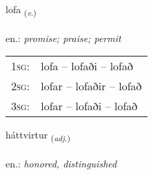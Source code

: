 \documentclass[frontgrid, backgrid]{flacards}\usepackage[]{graphicx}\usepackage[]{xcolor}
\begin{document}
\renewcommand{\flhead}{\vskip5pt \fboxsep=0pt {\small\bfseries\footnotesize Sagnorð | Verb}}
\renewcommand{\fcfoot}{\vskip5pt \fboxsep=0pt \hspace{2pt}{\small\bfseries\footnotesize 2K}}

\renewcommand{\blhead}{\vskip5pt {\small\bfseries\footnotesize Sagnorð | Verb }}
\renewcommand{\bcfoot}{\vskip5pt \hspace{2pt}{\small\bfseries\footnotesize 2K}}


{lofa \small{\textsubscript{(\textit{v.})}} \\[1ex] %
\textphonetic{[lɔːva]} \\
en.: \emph{promise; praise; permit} \\  [2ex]
\renewcommand*{\arraystretch}{0.8}
\begin{tabular}{p{1cm}l}
\textsc{1sg}: & lofa -- lofaði -- lofað \\ 
\textsc{2sg}: & lofar -- lofaðir -- lofað \\ 
\textsc{3sg}: & lofar -- lofaði -- lofað \\ 
\end{tabular}
}

\renewcommand{\flhead}{\vskip5pt \fboxsep=0pt {\small\bfseries\footnotesize Lýsingarorð | Adjective}}
\renewcommand{\fcfoot}{\vskip5pt \fboxsep=0pt \hspace{2pt}{\small\bfseries\footnotesize 2K}}

\renewcommand{\blhead}{\vskip5pt {\small\bfseries\footnotesize Lýsingarorð | Adjective }}
\renewcommand{\bcfoot}{\vskip5pt \hspace{2pt}{\small\bfseries\footnotesize 2K}}


{háttvirtur \small{\textsubscript{(\textit{adj.})}} \\[1ex] %
 \\
en.: \emph{honored, distinguished} \\  [2ex]
\renewcommand*{\arraystretch}{0.8}
}
\end{document}
